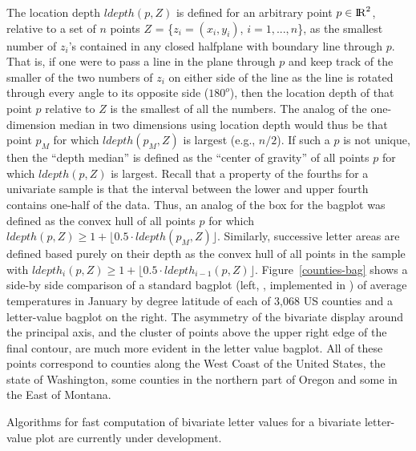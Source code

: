 \documentclass[12pt,oneside]{article}
\newcommand{\Reals}{{\rm I\kern-.1667em{}R}}
\begin{document}
The location depth $ldepth(p,Z)$ is defined for an arbitrary point $p \in \Reals^2$, relative to a set of $n$ points $Z$ = \{$z_i = (x_i, y_i)$, $i = 1,...,n$\}, as the smallest number of $z_i$'s contained in any closed halfplane with boundary line through $p$. That is, if one were to pass a line in the plane through $p$ and keep track of the smaller of the two numbers of $z_i$ on either side of the line as the line is rotated through every angle to its opposite side ($180^o$), then the location depth of that point $p$ relative to $Z$ is the smallest of all the numbers. The analog of the one-dimension median in two dimensions using location depth would thus be that point $p_M$ for which $ldepth(p_M, Z)$ is largest (e.g., $n/2$). If such a $p$ is not unique, then the ``depth median'' is defined as the ``center of gravity'' of all points $p$ for which $ldepth(p,Z)$ is largest. Recall that a property of the fourths for a univariate sample is that the interval between the lower and upper fourth contains one-half of the data. Thus, an analog of the box for the bagplot was defined as the convex hull of all points $p$ for which $ldepth(p,Z) \ge 1 +  \lfloor 0.5 \cdot  ldepth(p_M, Z) \rfloor$. Similarly,  successive letter areas are defined based purely on their depth as the convex hull of all points in the sample with $ldepth_i(p,Z) \ge 1 +  \lfloor 0.5 \cdot  ldepth_{i-1}(p, Z) \rfloor$.
Figure~\ref{counties-bag} shows a side-by side comparison of a standard bagplot (left, \citet{bagplots}, implemented in \citet{aplpack}) of average temperatures in January by degree latitude of each of 3,068 US counties and a letter-value bagplot on the right.
The asymmetry of the bivariate display around the principal axis,
and the cluster of points above the upper right edge of the final contour,
are much more evident in the letter value bagplot.  All of these points correspond to counties along the West Coast of the United States, the state of Washington, some counties in the northern part of Oregon and some in the East of Montana.

Algorithms for fast computation of bivariate letter values for a bivariate letter-value plot are currently under development.
\end{document}
